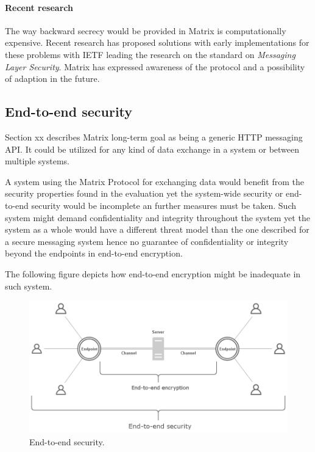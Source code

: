 \paragraph{Recent research}
The way backward secrecy would be provided in Matrix is computationally expensive. Recent research has proposed solutions with early implementations for these problems with IETF leading the research on the standard on \emph{Messaging Layer Security}. Matrix has expressed awareness of the protocol and a possibility of adaption in the future.

\subsection{End-to-end security}

Section xx describes Matrix long-term goal as being a generic HTTP messaging API. It could be utilized for any kind of data exchange in a system or between multiple systems.

A system using the Matrix Protocol for exchanging data would benefit from the security properties found in the evaluation yet the system-wide security or end-to-end security would be incomplete an further measures must be taken. Such system might demand confidentiality and integrity throughout the system yet the system as a whole would have a different threat model than the one described for a secure messaging system hence no guarantee of confidentiality or integrity beyond the endpoints in end-to-end encryption. 

The following figure depicts how end-to-end encryption might be inadequate in such system. 

\begin{figure}[H]
	\centering
	\includegraphics[width=12cm]{figures/e2esecurity.png}
	\caption{End-to-end security.}
	\label{fig:e2esecurity}
\end{figure}

